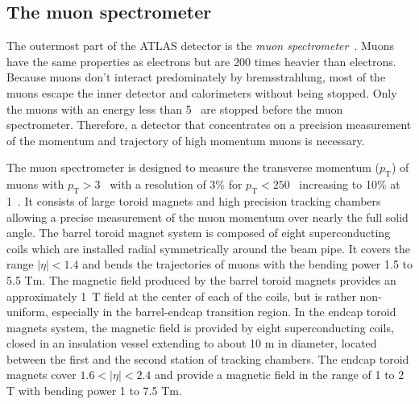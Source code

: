 
\subsection{The muon spectrometer}
\label{subsec:ae_the_muon_spectrometer}
The outermost part of the ATLAS detector is the \textit{muon spectrometer}~\cite{Aad:2008zzm, Palestini:2003dm, Diehl:2009bw}.
Muons have the same properties as electrons but are 200 times heavier than electrons.
Because muons don't interact predominately by bremsstrahlung, most of the muons escape the inner detector and calorimeters without being stopped.
Only the muons with an energy less than 5~{\GeV} are stopped before the muon spectrometer.
Therefore, a detector that concentrates on a precision measurement of the momentum and trajectory of high momentum muons is necessary.

The muon spectrometer is designed to measure the transverse momentum ($p_{\mathrm{T}}$) of muons with $p_{\mathrm{T}} > 3$~{\GeV} with a resolution of 3\% for $p_{\mathrm{T}} < 250$~{\GeV} increasing to 10\% at 1~{\TeV}.
It consists of large toroid magnets and high precision tracking chambers allowing a precise measurement of the muon momentum over nearly the full solid angle.
The barrel toroid magnet system is composed of eight superconducting coils which are installed radial symmetrically around the beam pipe.
It covers the range $|\eta| < 1.4$ and bends the trajectories of muons with the bending power 1.5 to 5.5 Tm.
The magnetic field produced by the barrel toroid magnets provides an approximately 1~T field at the center of each of the coils, but is rather non-uniform, especially in the barrel-endcap transition region.
In the endcap toroid magnets system, the magnetic field is provided by eight superconducting coils, closed in an insulation vessel extending to about 10 m in diameter, located between the first and the second station of tracking chambers.
The endcap toroid magnets cover $1.6 < |\eta| < 2.4$ and provide a magnetic field in the range of 1 to 2 T with bending power 1 to 7.5 Tm.


